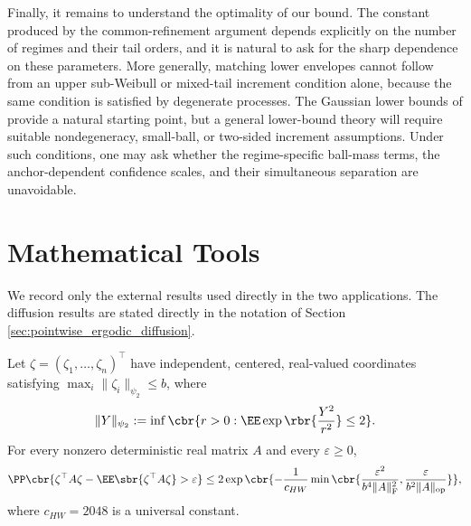 \documentclass[11pt]{article}
\begin{document}
Finally, it remains to understand the optimality of our
bound. The constant produced by the common-refinement argument depends
explicitly on the number of regimes and their tail orders, and it is
natural to ask for the sharp dependence on these parameters. More
generally, matching lower envelopes cannot follow from an upper
sub-Weibull or mixed-tail increment condition alone, because the same
condition is satisfied by degenerate processes. The Gaussian lower
bounds of \citet{xu2026} provide a natural starting point, but a general
lower-bound theory will require suitable nondegeneracy, small-ball, or
two-sided increment assumptions. Under such conditions, one may ask
whether the regime-specific ball-mass terms, the anchor-dependent
confidence scales, and their simultaneous separation are unavoidable.

\appendix
\section{Mathematical Tools}
\label{app:mathematical_tools}

We record only the external results used directly in the two applications.
The diffusion results are stated directly in the notation of
Section \ref{sec:pointwise_ergodic_diffusion}.

\begin{lemma}
\label{lem:tool_lamperski_hanson_wright}
Let $\zeta=(\zeta_1,\ldots,\zeta_n)^\top$ have independent, centered,
real-valued coordinates satisfying
$\max_i\|\zeta_i\|_{\psi_2}\le b$, where
\begin{align*}
\|Y\|_{\psi_2}
:=
\inf\cbr{
r>0:
\EE\exp\rbr{\frac{Y^2}{r^2}}\le2
}.
\end{align*}
For every nonzero deterministic real matrix $A$ and every
$\varepsilon\ge0$,
\begin{align*}
\PP\cbr{
\zeta^\top A\zeta-
\EE\sbr{\zeta^\top A\zeta}>\varepsilon
}
\le
2\exp\cbr{
-\frac1{c_{HW}}
\min\cbr{
\frac{\varepsilon^2}{b^4\|A\|_{\mathrm F}^2},
\frac{\varepsilon}{b^2\|A\|_{\mathrm{op}}}
}
},
\end{align*}
where $c_{HW}=2048$ is a universal constant.
\end{lemma}
\end{document}
